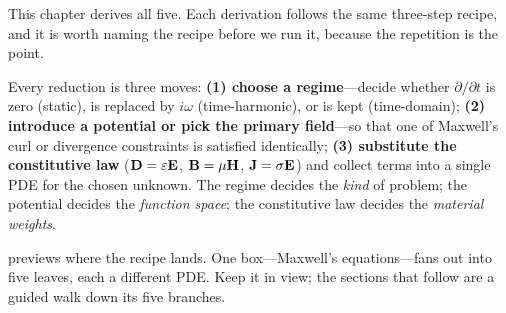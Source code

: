 This chapter derives all five. Each derivation follows the same three-step
recipe, and it is worth naming the recipe before we run it, because the
repetition is the point.

\begin{keyidea}
Every reduction is three moves: \textbf{(1) choose a regime}---decide whether
$\partial/\partial t$ is zero (static), is replaced by $i\omega$
(time-harmonic), or is kept (time-domain); \textbf{(2) introduce a
potential or pick the primary field}---so that one of Maxwell's curl or
divergence constraints is satisfied identically; \textbf{(3) substitute the
constitutive law} ($\mathbf{D}=\varepsilon\mathbf{E}$, $\mathbf{B}=\mu\mathbf{H}$, $\mathbf{J}=\sigma\mathbf{E}$) and
collect terms into a single PDE for the chosen unknown. The regime decides the
\emph{kind} of problem; the potential decides the \emph{function space}; the
constitutive law decides the \emph{material weights}.
\end{keyidea}

 previews where the recipe lands. One box---Maxwell's
equations---fans out into five leaves, each a different PDE. Keep it in view;
the sections that follow are a guided walk down its five branches.

